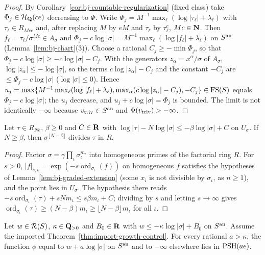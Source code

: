 \begin{proof}
By Corollary~\ref{cor:bj-countable-regularization} (fixed class) take $\Phi_j\in\mathcal H_{\mathbf{Q}}(ce)$ decreasing to
$\Phi$. Write $\Phi_j=M^{-1}\max_\ell(\log|\tau_\ell|+\lambda_\ell)$ with $\tau_\ell\in R_{Mce}$ and, after replacing $M$
by $eM$ and $\tau_\ell$ by $\tau_\ell^e$, $Mc\in\mathbf{N}$. Then $f_\ell=\tau_\ell/\sigma^{Mc}\in A_\sigma$ and
$\Phi_j-c\log|\sigma|=M^{-1}\max_\ell(\log|f_\ell|+\lambda_\ell)$ on $S^{\mathrm{an}}$ (Lemma~\ref{lem:bj-chart}(3)). Choose a rational
$C_j\ge-\min\Phi_j$, so that $\Phi_j-c\log|\sigma|\ge-c\log|\sigma|-C_j$. With the generators $z_\alpha=x^\alpha/\sigma$
of $A_\sigma$, $\log|z_\alpha|\le-\log|\sigma|$, so the terms $c\log|z_\alpha|-C_j$ and the constant $-C_j$ are
$\le\Phi_j-c\log|\sigma|$ ($\log|\sigma|\le0$). Hence
$u_j=\max\{M^{-1}\max_\ell(\log|f_\ell|+\lambda_\ell),\max_\alpha(c\log|z_\alpha|-C_j),-C_j\}\in\mathrm{FS}(S)$ equals
$\Phi_j-c\log|\sigma|$; the $u_j$ decrease, and $u_j+c\log|\sigma|=\Phi_j$ is bounded. The limit is not
identically $-\infty$ because $v_{\mathrm{triv}}\in S^{\mathrm{an}}$ and $\Phi(v_{\mathrm{triv}})>-\infty$.
\end{proof}

\begin{lemma}\label{lem:bj-divisibility}
\leanok
{}
Let $\tau\in R_{Ne}$, $\beta\ge0$ and $C\in\mathbf{R}$ with $\log|\tau|-N\log|\sigma|\le-\beta\log|\sigma|+C$ on $U_\sigma$.
If $N\ge\beta$, then $\sigma^{\lfloor N-\beta\rfloor}$ divides $\tau$ in $R$.
\end{lemma}

\begin{proof}
Factor $\sigma=\gamma\prod_\iota\sigma_\iota^{m_\iota}$ into homogeneous primes of the factorial ring $R$. For $s>0$,
$|f|_{s,\iota}=\exp(-s\operatorname{ord}_{\sigma_\iota}(f))$ on homogeneous $f$ satisfies the hypotheses of
Lemma~\ref{lem:bj-graded-extension} (some $x_i$ is not divisible by $\sigma_\iota$, as $n\ge1$), and the point lies
in $U_\sigma$. The hypothesis there reads $-s\operatorname{ord}_{\sigma_\iota}(\tau)+sNm_\iota\le s\beta m_\iota+C$; dividing by $s$ and
letting $s\to\infty$ gives $\operatorname{ord}_{\sigma_\iota}(\tau)\ge(N-\beta)m_\iota\ge\lfloor N-\beta\rfloor m_\iota$ for all $\iota$.
\end{proof}

\begin{lemma}\label{lem:bj-compactification-extend}
\leanok
{}
Let $w\in\mathcal{R}(S)$, $\kappa\in\mathbf{Q}_{>0}$ and $B_0\in\mathbf{R}$ with $w\le-\kappa\log|\sigma|+B_0$ on $S^{\mathrm{an}}$. Assume the imported
Theorem~\ref{thm:import-growth-control}. For every rational $a>\kappa$, the function $\phi$ equal to
$w+a\log|\sigma|$ on $S^{\mathrm{an}}$ and to $-\infty$ elsewhere lies in $\operatorname{PSH}(ae)$.
\end{lemma}

